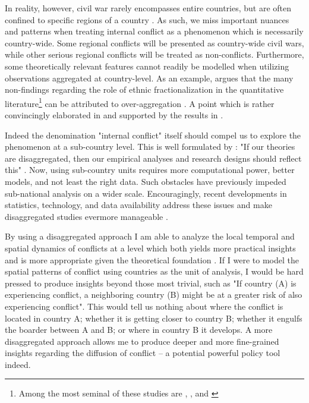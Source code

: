 \documentclass[a4paper]{article}
\begin{document}
In reality, however, civil war rarely encompasses entire countries, but are often confined to specific regions of a country \cite[487]{Cederman_Gleditsch_2009}. As such, we miss important nuances and patterns when treating internal conflict as a phenomenon which is necessarily country-wide. Some regional conflicts will be presented as country-wide civil wars, while other serious regional conflicts will be treated as non-conflicts. Furthermore, some theoretically relevant features cannot readily be modelled when utilizing observations aggregated at country-level. As an example, \cite{Cederman_Gleditsch_2009} argues that the many non-findings regarding the role of ethnic fractionalization in the quantitative literature\footnote{Among the most seminal of these studies are \cite{Fearon_Laitin_2003}, \cite{Collier_Hoeffler_2004}, and \cite{Hegre_Sambanis_2006}} can be attributed to over-aggregation \citep[493]{Cederman_Gleditsch_2009}. A point which is rather convincingly elaborated in \cite{Cederman_Gleditsch_Buhaug_2013} and supported by the results in \cite{Goldstone_2010}. 

Indeed the denomination "internal conflict" itself should compel us to explore the phenomenon at a sub-country level. This is well formulated by \cite{Cederman_Gleditsch_2009}: "If our theories are disaggregated, then our empirical analyses and research designs should reflect this" \citep[490]{Cederman_Gleditsch_2009}. Now, using sub-country units requires more computational power, better models, and not least the right data. Such obstacles have previously impeded sub-national analysis on a wider scale. Encouragingly, recent developments in statistics, technology, and data availability address these issues and make disaggregated studies evermore manageable \citep[446]{ol2010afghanistan}.\par

By using a disaggregated approach I am able to analyze the local temporal and spatial dynamics of conflicts at a level which both yields more practical insights and is more appropriate given the theoretical foundation \citep[446]{ol2010afghanistan}. If I were to model the spatial patterns of conflict using countries as the unit of analysis, I would be hard pressed to produce insights beyond those most trivial, such as "If country (A) is experiencing conflict, a neighboring country (B) might be at a greater risk of also experiencing conflict". This would tell us nothing about where the conflict is located in country A; whether it is getting closer to country B; whether it engulfs the boarder between A and B; or where in country B it develops. A more disaggregated approach allows me to produce deeper and more fine-grained insights regarding the diffusion of conflict -- a potential powerful policy tool indeed.\par 
\end{document}

